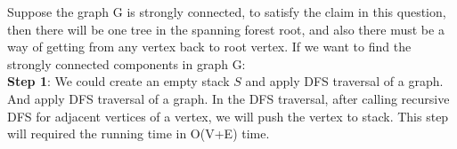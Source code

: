 \documentclass{article}
\begin{document}
\begin{center}
\end{center}

\noindent Suppose the graph G is strongly connected, to satisfy the claim in this question, then there will be one tree in the spanning forest root, and also there must be a way of getting from any vertex back to root vertex. If we want to find the strongly connected components in graph G:\\

\noindent \textbf{Step 1}:  We could create an empty stack $S$ and apply DFS traversal of a graph. And apply DFS traversal of a graph. In the DFS traversal, after calling recursive DFS for adjacent vertices of a vertex, we will push the vertex to stack. This step will required the running time in O(V+E) time.\\
\end{document}
